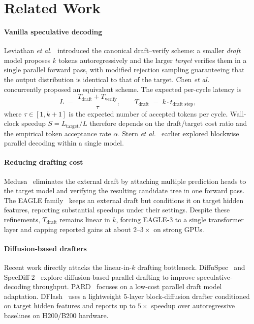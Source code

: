 \section{Related Work}
\label{sec:related}

\paragraph{Vanilla speculative decoding}
Leviathan \emph{et al.}~\cite{Leviathan2023} introduced the canonical
draft--verify scheme: a smaller \emph{draft} model proposes $k$ tokens
autoregressively and the larger \emph{target} verifies them in a single
parallel forward pass, with modified rejection sampling guaranteeing that the
output distribution is identical to that of the target. Chen
\emph{et al.}~\cite{Chen2023specsampling} concurrently proposed an equivalent
scheme. The expected per-cycle latency is
\begin{equation}
  L \;=\; \frac{T_{\text{draft}} + T_{\text{verify}}}{\tau},
  \qquad
  T_{\text{draft}} \;=\; k \cdot t_{\text{draft step}},
  \label{eq:specdec-latency}
\end{equation}
where $\tau \in [1, k{+}1]$ is the expected number of accepted tokens per
cycle. Wall-clock speedup $S = L_{\text{target}}/L$ therefore depends on the
draft/target cost ratio and the empirical token acceptance rate $\alpha$.
Stern \emph{et al.}~\cite{Stern2018blockwise} earlier explored blockwise
parallel decoding within a single model.

\paragraph{Reducing drafting cost}
Medusa~\cite{Cai2024Medusa} eliminates the external draft by attaching
multiple prediction heads to the target model and verifying the resulting
candidate tree in one forward pass. The EAGLE
family~\cite{Li2024Eagle,Li2024Eagle2,Li2025Eagle3} keeps an external draft
but conditions it on target hidden features, reporting substantial speedups
under their settings. Despite these refinements, $T_{\text{draft}}$ remains
linear in $k$, forcing EAGLE-3 to a single transformer layer and capping
reported gains at about $2$--$3\times$ on strong GPUs.

\paragraph{Diffusion-based drafters}
Recent work directly attacks the linear-in-$k$ drafting bottleneck.
DiffuSpec~\cite{Li2025DiffuSpec} and SpecDiff-2~\cite{Sandler2025SpecDiff2}
explore diffusion-based parallel drafting to improve speculative-decoding
throughput. PARD~\cite{An2025PARD} focuses on a low-cost parallel draft model
adaptation. DFlash~\cite{Chen2026dflash} uses a lightweight 5-layer
block-diffusion drafter conditioned on target hidden features and reports up
to $5\times$ speedup over autoregressive baselines on H200/B200 hardware.

